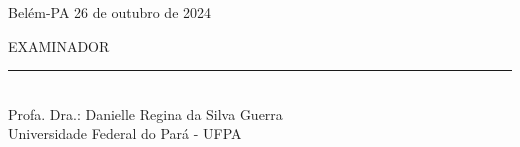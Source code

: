 \begin{center}
\begin{minipage}{7cm}
	Belém-PA 26 de outubro de 2024
	\vspace{4cm}
\end{minipage}

\onehalfspacing
\begin{center}
	
	EXAMINADOR\\
	\vspace{3cm}
	\rule{10cm}{0.15mm} \\
	Profa. Dra.: Danielle Regina da Silva Guerra\\
	Universidade Federal do Pará - UFPA
\end{center}
\newpage

\begin{center}
    \thispagestyle{empty}
	\listoffigures
	\newpage
    \thispagestyle{empty}
    \tableofcontents

\end{center}

\newpage
\thispagestyle{empty}
	
\end{center}